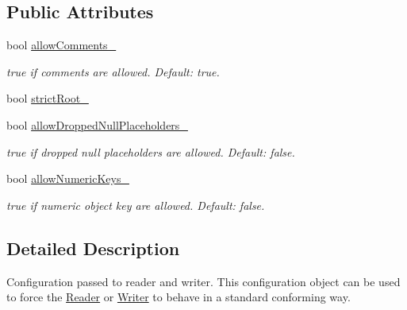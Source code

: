 \subsection*{Public Attributes}
\begin{DoxyCompactItemize}
\item 
bool \hyperlink{classJson_1_1Features_a33afd389719624b6bdb23950b3c346c9}{allow\+Comments\+\_\+}\hypertarget{classJson_1_1Features_a33afd389719624b6bdb23950b3c346c9}{}\label{classJson_1_1Features_a33afd389719624b6bdb23950b3c346c9}

\begin{DoxyCompactList}\small\item\em {\ttfamily true} if comments are allowed. Default\+: {\ttfamily true}. \end{DoxyCompactList}\item 
bool \hyperlink{classJson_1_1Features_a1162c37a1458adc32582b585b552f9c3}{strict\+Root\+\_\+}
\item 
bool \hyperlink{classJson_1_1Features_a5076aa72c05c7596ac339ede36c97a6a}{allow\+Dropped\+Null\+Placeholders\+\_\+}\hypertarget{classJson_1_1Features_a5076aa72c05c7596ac339ede36c97a6a}{}\label{classJson_1_1Features_a5076aa72c05c7596ac339ede36c97a6a}

\begin{DoxyCompactList}\small\item\em {\ttfamily true} if dropped null placeholders are allowed. Default\+: {\ttfamily false}. \end{DoxyCompactList}\item 
bool \hyperlink{classJson_1_1Features_aff3cb16b79d15d3d761b11a0dd6d4d6b}{allow\+Numeric\+Keys\+\_\+}\hypertarget{classJson_1_1Features_aff3cb16b79d15d3d761b11a0dd6d4d6b}{}\label{classJson_1_1Features_aff3cb16b79d15d3d761b11a0dd6d4d6b}

\begin{DoxyCompactList}\small\item\em {\ttfamily true} if numeric object key are allowed. Default\+: {\ttfamily false}. \end{DoxyCompactList}\end{DoxyCompactItemize}


\subsection{Detailed Description}
Configuration passed to reader and writer. This configuration object can be used to force the \hyperlink{classJson_1_1Reader}{Reader} or \hyperlink{classJson_1_1Writer}{Writer} to behave in a standard conforming way. 

